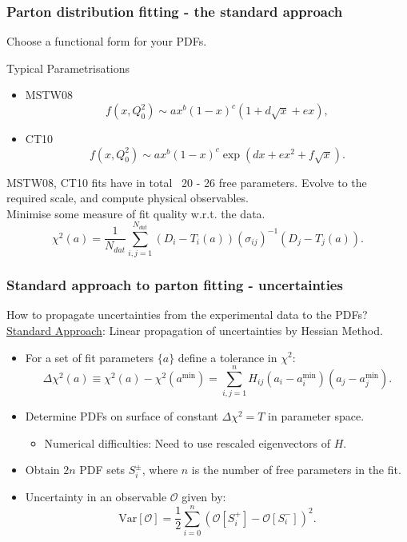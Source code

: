\documentclass[10pt]{beamer}
\newcommand{\be}{\begin{equation*}}
\newcommand{\ee}{\end{equation*}}
\newcommand{\vso}{\vskip15pt}
\begin{document}
\begin{frame}
\frametitle{Parton distribution fitting - the standard approach}
Choose a functional form for your PDFs.
\begin{block} {\centering Typical Parametrisations}
\begin{itemize}
		\item<1->MSTW08     \be f(x,Q_0^2) \sim ax^{b}(1-x)^{c}(1+d\sqrt{x}+e x),\ee
		\item<1->CT10    \be f(x,Q_0^2) \sim ax^b(1-x)^c \exp{(dx + ex^2 + f\sqrt{x})}.\ee
	\end{itemize}
\end{block}
	\vskip15pt
MSTW08, CT10 fits have in total ~20 - 26 free parameters.
\vskip10pt
Evolve to the required scale, and compute physical observables.\\
Minimise some measure of fit quality w.r.t. the data.
	\be \chi^2(a)=\frac{1}{N_{dat}}\sum_{i,j=1}^{N_{dat}}(D_i-T_i(a))(\sigma_{ij})^{-1}(D_j-T_j(a)).\ee

\end{frame}


\begin{frame}
\frametitle{Standard approach to parton fitting - uncertainties}
How to propagate uncertainties from the experimental data to the PDFs?
\underline{Standard Approach}: Linear propagation of uncertainties by Hessian Method.
\begin{itemize}
		\item<1->For a set of fit parameters $\{ a\} $ define a tolerance in $\chi^2$:
		\be \Delta\chi^2(a) \equiv \chi^2(a) - \chi^2(a^\mathrm{min}) = \sum^n_{i,j=1}H_{ij}(a_i-a_i^\mathrm{min})(a_j - a_j^\mathrm{min}). \ee
		\item<1-> Determine PDFs on surface of constant $\Delta\chi^2=T$ in parameter space.
		\begin{itemize}
			\item<1-> Numerical difficulties: Need to use rescaled eigenvectors of $H$.
		\end{itemize}
		\item<1-> Obtain $2n$ PDF sets $S_i^\pm$, where $n$ is the number of free parameters in the fit. \vso
		\item<1-> Uncertainty in an observable $\mathcal{O}$ given by:
		\be \mathrm{Var}[\mathcal{O}] = \frac{1}{2}\sum_{i=0}^n (\mathcal{O}[S_i^+] - \mathcal{O}[S_i^-] )^2.\ee
\end{itemize}

\end{frame}
\end{document}
